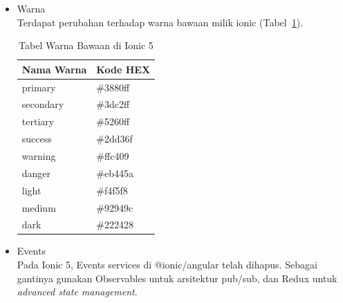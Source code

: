 \begin{enumerate}
\begin{itemize}
		Selain yang sudah disebutkan, terdapat beberapa komponen lain yang mendapat perubahan di Ionic 5, namun tidak ditulis di dalam dokumen skripsi ini. Komponen-komponen tersebut antara lain Action Sheet, Anchor, Card, FAB, Item, Menu Button, Nav Link, Radio, Segment, Segment Button, Skeleton Text, Split Pane, dan Tabs~\footnote{\textit{`Breaking Changes'} https://github.com/ionic-team/ionic-framework/blob/main/BREAKING.md, Diakses pada 20 November 2021. \label{ref:breakingChangesIonic5}}.
		\item Warna \\
		Terdapat perubahan terhadap warna bawaan milik ionic (Tabel~\ref{table:colors}).
		\begin{table}[H]
		\centering
			\begin{tabular}{|l|l|}
				\hline
				Nama Warna & Kode HEX \\ \hline
				primary    & \#3880ff \\ \hline
				secondary  & \#3dc2ff \\ \hline
				tertiary   & \#5260ff \\ \hline
				success    & \#2dd36f \\ \hline
				warning    & \#ffc409 \\ \hline
				danger     & \#eb445a \\ \hline
				light      & \#f4f5f8 \\ \hline
				medium     & \#92949c \\ \hline
				dark       & \#222428 \\ \hline
			\end{tabular}
			\caption{Tabel Warna Bawaan di Ionic 5}
			\label{table:colors}
		\end{table}
		
		\item Events \\
		Pada Ionic 5, Events services di @ionic/angular telah dihapus. Sebagai gantinya gunakan Observables untuk arsitektur pub/sub, dan Redux untuk {\it advanced state management}.
		

\end{itemize}
\end{enumerate}
